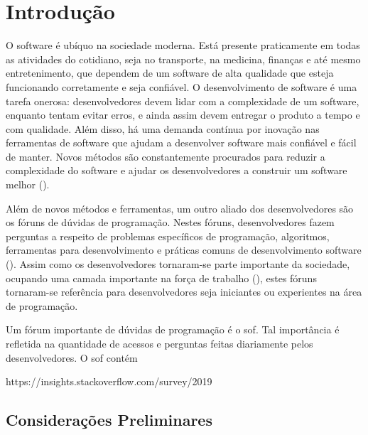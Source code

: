 \chapter{Introdução}
\label{cap:introducao}

O software é ubíquo na sociedade moderna. Está presente praticamente em todas as atividades do cotidiano, seja no transporte, na medicina, finanças e até mesmo entretenimento, que dependem de um software de alta qualidade que esteja funcionando corretamente e seja confiável. O desenvolvimento de software é uma tarefa onerosa: desenvolvedores devem lidar com a complexidade de um software, enquanto tentam evitar erros, e ainda assim devem entregar o produto a tempo e com qualidade. Além disso, há uma demanda contínua por inovação nas ferramentas de software que ajudam a desenvolver software mais confiável e fácil de manter. Novos métodos são constantemente procurados para reduzir a complexidade do software e ajudar os desenvolvedores a construir um software melhor (\cite{Allamanis:2018:SML}).

Além de novos métodos e ferramentas, um outro aliado dos desenvolvedores são os fóruns de dúvidas de programação. Nestes fóruns, desenvolvedores fazem perguntas a respeito de problemas específicos de programação, algoritmos, ferramentas para desenvolvimento e práticas comuns de desenvolvimento software (\cite{stackoverflow-questions-topics-2019}). Assim como os desenvolvedores tornaram-se parte importante da sociedade, ocupando uma camada importante na força de trabalho (\cite{wikipedia-developers-demographics-2019}), estes fóruns tornaram-se referência para desenvolvedores seja iniciantes ou experientes na área de programação.

Um fórum importante de dúvidas de programação é o \Gls{sof}. Tal importância é refletida na quantidade de acessos e perguntas feitas diariamente pelos desenvolvedores. O \Gls{sof} contém 

https://insights.stackoverflow.com/survey/2019





\section{Considerações Preliminares}
\label{sec:consideracoes_preliminares}

